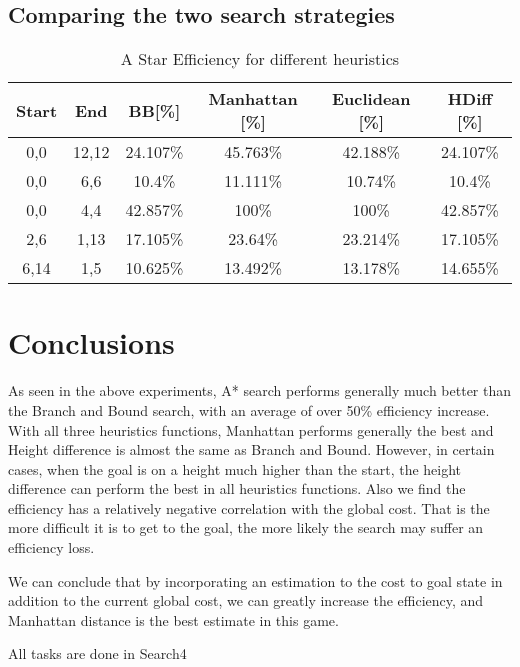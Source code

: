 \documentclass[11pt,oneside]{article}
\begin{document}
\subsection{Comparing the two search strategies}
\begin{table}[ht]
    \centering
    \begin{tabular}{|c|c|c|c|c|c|}
        Start & End &  BB[\%]  & Manhattan [\%] & Euclidean [\%] & HDiff [\%]\\ \hline
        0,0 & 12,12 & 24.107\% & 45.763\% & 42.188\% & 24.107\% \\
        0,0 & 6,6 & 10.4\% & 11.111\% & 10.74\% & 10.4\% \\
        0,0 & 4,4 & 42.857\% & 100\% & 100\% & 42.857\% \\
        2,6 & 1,13 & 17.105\% & 23.64\% & 23.214\% & 17.105\% \\
        6,14 & 1,5 & 10.625\% & 13.492\% & 13.178\% & 14.655\% \\
    \end{tabular}
    \caption{A Star Efficiency for different heuristics}
    \label{tab:my_label}
\end{table}

\section{Conclusions}
As seen in the above experiments, A* search performs generally much better than the Branch and Bound search, with an average of over 50\% efficiency increase. With all three heuristics functions, Manhattan performs generally the best and Height difference is almost the same as Branch and Bound. However, in certain cases, when the goal is on a height much higher than the start, the height difference can perform the best in all heuristics functions. Also we find the efficiency has a relatively negative correlation with the global cost. That is the more difficult it is to get to the goal, the more likely the search may suffer an efficiency loss. 

We can conclude that by incorporating an estimation to the cost to goal state in addition to the current global cost, we can greatly increase the efficiency, and Manhattan distance is the best estimate in this game. 

All tasks are done in Search4
\end{document}
